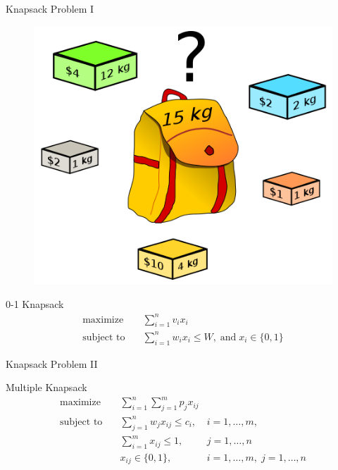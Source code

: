 \documentclass[10pt,utf8,presentation]{beamer}
\begin{document}
\begin{frame}{Knapsack Problem I}

 
\begin{figure}
\includegraphics[scale=0.3]{fig/knapsack.png}
\end{figure}


\begin{block}{0-1 Knapsack}
  \begin{equation*}
    \begin{aligned}
      \text{maximize} & \quad \sum_{i=1}^{n} v_{i} x_{i} \\
      \text{subject to} & \quad \sum_{i=1}^{n} w_i x_{i} \leq W, \; \text{and} \; x_i \in \{0, 1\} 
    \end{aligned}
    \end{equation*}

\end{block}
\end{frame}


\begin{frame}{Knapsack Problem II}
 
\begin{block}{Multiple Knapsack}
  \begin{equation*}
    \begin{aligned}
      \text{maximize} & \quad \sum_{i=1}^{n} \sum_{j=1}^{m} p_{j} x_{ij} \\
      \text{subject to} & \quad \sum_{j=1}^{n} w_j x_{ij} \leq c_i, & i=1, \ldots, m, \\
      & \quad \sum_{i=1}^{m} x_{ij} \leq 1, & j = 1, \ldots, n \\
      & \quad x_{ij} \in \{0,1\}, & i=1, \ldots, m, \; j = 1, \ldots, n
    \end{aligned}
    \end{equation*}

\end{block}
\end{frame}
\end{document}

